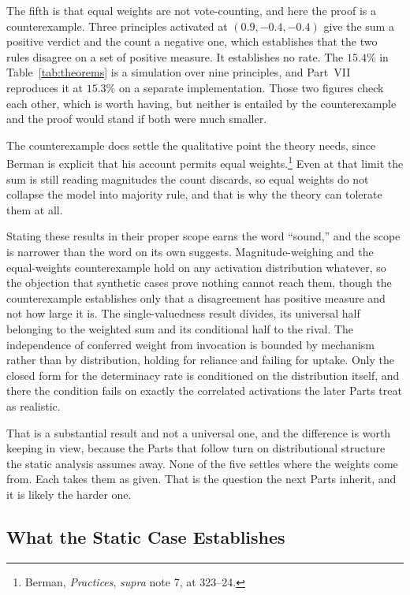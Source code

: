 The fifth is that equal weights are not vote-counting, and here the proof is a
counterexample. Three principles activated at $(0.9, -0.4, -0.4)$ give the sum
a positive verdict and the count a negative one, which establishes that the
two rules disagree on a set of positive measure. It establishes no rate. The $15.4\%$ in Table~\ref{tab:theorems} is a simulation over nine principles,
and Part~VII reproduces it at $15.3\%$ on a separate implementation. Those two figures
check each other, which is worth having, but neither is entailed by the
counterexample and the proof would stand if both were much smaller.

The counterexample does settle the qualitative point the theory needs,
since Berman is explicit that his account permits equal
weights.\footnote{Berman, \textit{Practices}, \textit{supra} note 7, at
323--24.} Even at that limit the sum is still reading magnitudes the count
discards, so equal weights do not collapse the model into majority rule, and
that is why the theory can tolerate them at all.

Stating these results in their proper scope earns the word ``sound,''
and the scope is narrower than the word on its own suggests.
Magnitude-weighing and the equal-weights counterexample hold on any activation
distribution whatever, so the objection that synthetic cases prove nothing
cannot reach them, though the counterexample establishes only that a
disagreement has positive measure and not how large it is. The
single-valuedness result divides, its universal half belonging to the weighted
sum and its conditional half to the rival. The independence of conferred
weight from invocation is bounded by mechanism rather than by distribution,
holding for reliance and failing for uptake. Only the closed form for the
determinacy rate is conditioned on the distribution itself, and there the
condition fails on exactly the correlated activations the later Parts treat as
realistic.

That is a substantial result and not a universal one, and the difference is
worth keeping in view, because the Parts that follow turn on distributional
structure the static analysis assumes away. None of the five settles
where the weights come from. Each takes them as given. That is the question
the next Parts inherit, and it is likely the harder one.

\subsection{What the Static Case Establishes}

